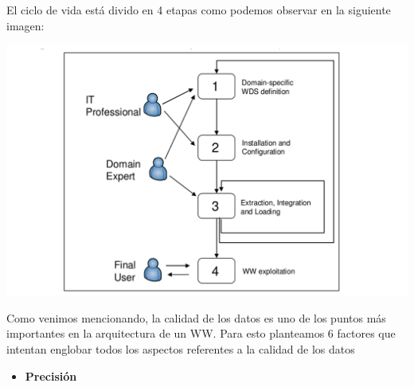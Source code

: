 \documentclass{fancyslides}
\begin{document}
\begin{frame}
\end{frame}

\begin{frame}
\misc
{ 
  El ciclo de vida está divido en 4 etapas como podemos observar en la siguiente imagen:
}
\end{frame}

\begin{frame}
\misc
{

\begin{center}
  \includegraphics[scale=0.15]{lifecycle}
\end{center}

}
\end{frame}


\begin{frame}
\end{frame}

\begin{frame}
\misc
{ 
  Como venimos mencionando, la calidad de los datos es uno de los puntos más importantes en la arquitectura de un WW. Para esto planteamos 6 factores que intentan englobar todos los aspectos referentes a la calidad de los datos
}
\end{frame}

\begin{frame}
\misc
{
\begin{itemize}
  \item \textbf{Precisión}
\end{itemize}

}
\end{frame}
\end{document}
